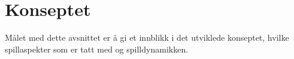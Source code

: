 \section{Konseptet}
Målet med dette avsnittet er å gi et innblikk i det utviklede konseptet,
hvilke spillaspekter som er tatt med og spilldynamikken.

